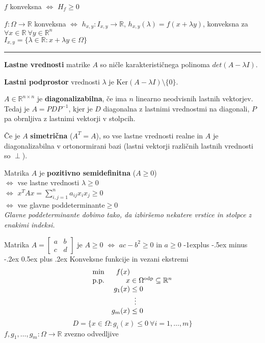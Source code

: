 \documentclass[a4paper,8pt]{extarticle}
\makeatletter
\renewcommand{\subsection}{\@startsection{subsection}{2}{0mm}%
                                {-1explus -.5ex minus -.2ex}%
                                {0.5ex plus .2ex}%
                                {\normalfont\normalsize\bfseries}}
\makeatother
\begin{document}
\begin{multicols}{4}
$f$ konveksna $\iff$ $H_f \geq 0$

$f: \Omega \to \mathbb{R}$ konveksna $\iff$ $h_{x,y}:I_{x,y} \to \mathbb{R}$, $h_{x,y}(\lambda) = f(x+\lambda y)$, konveksna za $\forall x \in \mathbb{R}\ \forall y \in \mathbb{R}^n$\\
$I_{x,y} = \{\lambda \in \mathbb{R} : x+\lambda y \in \Omega\}$

\noindent\rule{2cm}{0.4pt}

\textbf{Lastne vrednosti} matrike $A$ so ničle karakterističnega polinoma $det(A - \lambda I)$.

\textbf{Lastni podprostor} vrednosti $\lambda$ je $\text{Ker}(A-\lambda I) \setminus \{0\}$.

$A \in \mathbb{R}^{n\times n}$ je \textbf{diagonalizabilna}, če ima $n$ linearno neodvisnih lastnih vektorjev. Tedaj je $A = PDP^{-1}$, kjer je $D$ diagonalna z lastnimi vrednostmi na diagonali, $P$ pa obrnljiva z lastnimi vektorji v stolpcih.

Če je $A$ \textbf{simetrična} ($A^T = A$), so vse lastne vrednosti realne in $A$ je diagonalizabilna v ortonormirani bazi (lastni vektorji različnih lastnih vrednosti so $\perp$).

Matrika $A$ je \textbf{pozitivno semidefinitna} ($A \geq 0$) \\
$\iff$ vse lastne vrednosti $\lambda \geq 0$ \\
$\iff$ $x^T A x = \sum_{i,j = 1}^n a_{ij} x_i x_j \geq 0$ \\
$\iff$ vse glavne poddeterminante$\geq 0$ \\

\emph{Glavne poddeterminante dobimo tako, da izbiršemo nekatere vrstice in stolpce z enakimi indeksi.}

Matrika $A = \begin{bmatrix}
	a & b \\
	c & d
\end{bmatrix}$ je $A \geq 0$ $\iff$ $ac - b^2 \geq 0$ in $a \geq 0$
\subsection{Konveksne funkcije in vezani ekstremi}
\begin{align*}
	\begin{array}{l r@{\;} l} %
		\min 		& f(x)	\\		
		\text{p.p.} & x &\in \Omega^{\text{odp}} \subseteq \mathbb{R}^n \\
		& g_1(x) &\leq 0 \\
		& 									& \  \vdots \\										
		& g_m(x) &\leq 0 \\
	\end{array}
\end{align*}
\[D = \{ x \in \Omega: g_i(x) \leq 0\ \forall i = 1,\dots, m\}\]
$f, g_1, \dots, g_m : \Omega \to \mathbb{R}$ zvezno odvedljive\\


\end{multicols}
\end{document}
